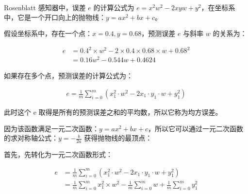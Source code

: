 Rosenblatt 感知器中，误差 $e$ 的计算公式为 $e = x^2w^2 - 2xyw + y^2$，在坐标系中，它是一个开口向上的抛物线：$y = ax^2 + bx + c$。

假设坐标系中，存在一个点：$x = 0.4, y = 0.68$，预测误差 $e$ 与斜率 $w$ 的关系为：

\[
	\begin{aligned}
		e & = 0.4^2 \times w^2 - 2 \times 0.4 \times 0.68 \times w + 0.68^2 \\
		  & = 0.16w^2 - 0.544w + 0.4624
	\end{aligned}
\]

\begin{center}
\end{center}

如果存在多个点，预测误差的计算公式为：

\[
	\begin{aligned}
		e = \frac{1}{m} \sum^{m}_{i = 0} (x_1^2 \cdot w^2 - 2x_1 \cdot y_1 \cdot w + y_1^2)
	\end{aligned}
\]

此时这个 e 取得是所有的预测误差之和的平均数，所以它称为均方误差。

因为该函数满足一元二次函数：$y = ax^2 + bx + c$，所以它可以通过一元二次函数的求对称轴公式：$y = -\frac{b}{2a}$ 获得抛物线的最顶点：

首先，先转化为一元二次函数形式：

\[
	\begin{aligned}
		e & = \frac{1}{m} \sum^{m}_{i = 0} (x_1^2 \cdot w^2 - 2x_1 \cdot y_1 \cdot w + y_1^2)                                     \\
		  & = \frac{1}{m} \sum^{m}_{i = 0} x_1^2 \times w^2 - \frac{1}{m} \sum^{m}_{i = 0} w + \frac{1}{m} \sum^{m}_{i = 0} y_1^2
	\end{aligned}
\]

